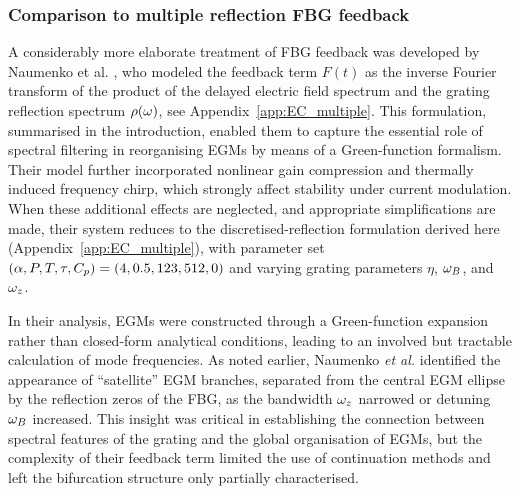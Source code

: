 \subsubsection{Comparison to multiple reflection FBG feedback}
\label{subsubsec:naumenko}
%
A considerably more elaborate treatment of FBG feedback was developed by Naumenko et al. \cite{naumenko2003characteristics,naumenko2004slow}, who modeled the feedback term $F(t)$ as the inverse Fourier transform of the product of the delayed electric field spectrum and the grating reflection spectrum $\rho(\omega)$, see Appendix~\ref{app:EC_multiple}.
This formulation, summarised in the introduction, enabled them to capture the essential role of spectral filtering in reorganising EGMs by means of a Green-function formalism. 
Their model further incorporated nonlinear gain compression and thermally induced frequency chirp, which strongly affect stability under current modulation.
When these additional effects are neglected, and appropriate simplifications are made, their system reduces to the discretised-reflection formulation derived here (Appendix~\ref{app:EC_multiple}), with parameter set $(\alpha, P, T, \tau, C_p) = (4, 0.5, 123, 512, 0)$ and varying grating parameters $\eta$, $\omega_B$, and $\omega_z$.
%
\par
%
In their analysis, EGMs were constructed through a Green-function expansion rather than closed-form analytical conditions, leading to an involved but tractable calculation of mode frequencies.
As noted earlier, Naumenko \textit{et al.} identified the appearance of “satellite” EGM branches, separated from the central EGM ellipse by the reflection zeros of the FBG, as the bandwidth $\omega_z$ narrowed or detuning $\omega_B$ increased.
This insight was critical in establishing the connection between spectral features of the grating and the global organisation of EGMs, but the complexity of their feedback term limited the use of continuation methods and left the bifurcation structure only partially characterised.
%
